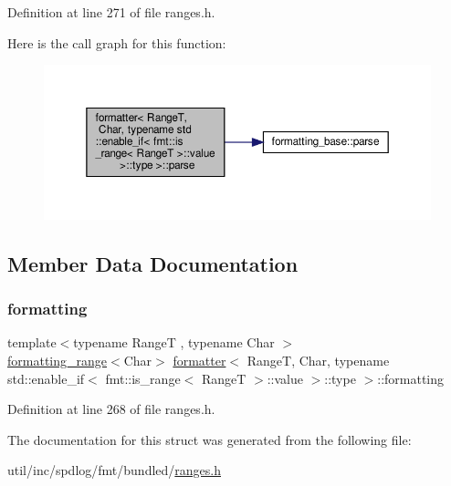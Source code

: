 Definition at line 271 of file ranges.\+h.

Here is the call graph for this function\+:
\nopagebreak
\begin{figure}[H]
\begin{center}
\leavevmode
\includegraphics[width=350pt]{structformatter_3_01_range_t_00_01_char_00_01typename_01std_1_1enable__if_3_01fmt_1_1is__range_338ef07b6d6c7537efaa2c888f2ea4c8d_a44de9d8176748d483fc5471afe644b73_cgraph}
\end{center}
\end{figure}


\subsection{Member Data Documentation}
\mbox{\label{structformatter_3_01_range_t_00_01_char_00_01typename_01std_1_1enable__if_3_01fmt_1_1is__range_338ef07b6d6c7537efaa2c888f2ea4c8d_aa3df697d3373d6ad318447f6b31a3daf}} 
\subsubsection{\texorpdfstring{formatting}{formatting}}
{\footnotesize\ttfamily template$<$typename RangeT , typename Char $>$ \\
\hyperlink{structformatting__range}{formatting\+\_\+range}$<$Char$>$ \hyperlink{structformatter}{formatter}$<$ RangeT, Char, typename std\+::enable\+\_\+if$<$ fmt\+::is\+\_\+range$<$ RangeT $>$\+::value $>$\+::type $>$\+::formatting}



Definition at line 268 of file ranges.\+h.



The documentation for this struct was generated from the following file\+:\begin{DoxyCompactItemize}
\item 
util/inc/spdlog/fmt/bundled/\hyperlink{ranges_8h}{ranges.\+h}\end{DoxyCompactItemize}
